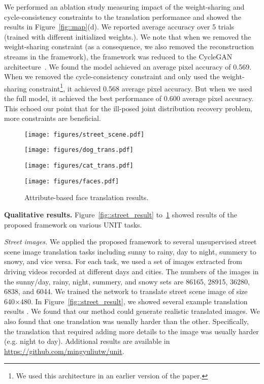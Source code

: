 \documentclass{article}
\begin{document}
We performed an ablation study measuring impact of the weight-sharing and cycle-consistency constraints to the translation performance and showed the results in Figure~\ref{fig::map}(d). We reported average accuracy over 5 trials (trained with different initialized weights.). We note that when we removed the weight-sharing constraint (as a consequence, we also removed the reconstruction streams in the framework), the framework was reduced to the CycleGAN architecture~\cite{zhu2017unpaired,kim2017learning}. We found the model achieved an average pixel accuracy of 0.569. When we removed the cycle-consistency constraint and only used the weight-sharing constraint\footnote{We used this architecture in an earlier version of the paper.}, it achieved 0.568 average pixel accuracy. But when we used the full model, it achieved the best performance of 0.600 average pixel accuracy. This echoed our point that for the ill-posed joint distribution recovery problem, more constraints are beneficial.

\begin{figure}
\centering
\texttt{[image: figures/street\_scene.pdf]}
\vspace{-2mm}
\caption{\small Street scene image translation results. For each pair, left is input and right is the translated image.}
\label{fig::street_result}
\texttt{[image: figures/dog\_trans.pdf]}
\caption{\small Dog breed translation results.}
\label{fig::dog_result}
\texttt{[image: figures/cat\_trans.pdf]}
\caption{\small Cat species translation results.}
\label{fig::cat_result}
\texttt{[image: figures/faces.pdf]}
\caption{\small Attribute-based face translation results.}
\label{fig::face_result}
\end{figure}

{\bf Qualitative results.} Figure~\ref{fig::street_result} to~\ref{fig::face_result} showed  results of the proposed framework on various UNIT tasks.

{\it Street images.} We applied the proposed framework to several unsupervised street scene image translation tasks including sunny to rainy, day to night, summery to snowy, and vice versa. For each task, we used a set of images extracted from driving videos recorded at different days and cities. The numbers of the images in the sunny/day, rainy, night, summery, and snowy sets are 86165, 28915, 36280, 6838, and 6044. We trained the network to translate street scene image of size  640$\times$480. In Figure~\ref{fig::street_result}, we showed several example translation results . We found that our method could generate realistic translated images. We also found that one translation was usually harder than the other. Specifically, the translation that required adding more details to the image was usually harder (e.g. night to day). Additional results are available in \href{https://github.com/mingyuliutw/unit}{https://github.com/mingyuliutw/unit}.
\end{document}
